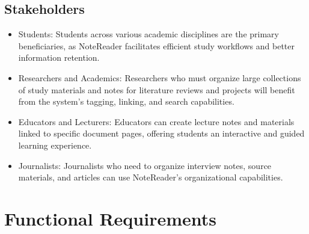 \subsection{Stakeholders}
\begin{itemize}
    \item Students: Students across various academic disciplines are the primary beneficiaries, as NoteReader facilitates efficient study workflows and better information retention.
    \item Researchers and Academics: Researchers who must organize large collections of study materials and notes for literature reviews and projects will benefit from the system’s tagging, linking, and search capabilities.
    \item Educators and Lecturers: Educators can create lecture notes and materials linked to specific document pages, offering students an interactive and guided learning experience.
    \item Journalists: Journalists who need to organize interview notes, source materials, and articles can use NoteReader’s organizational capabilities.
\end{itemize}



\section{Functional Requirements}



